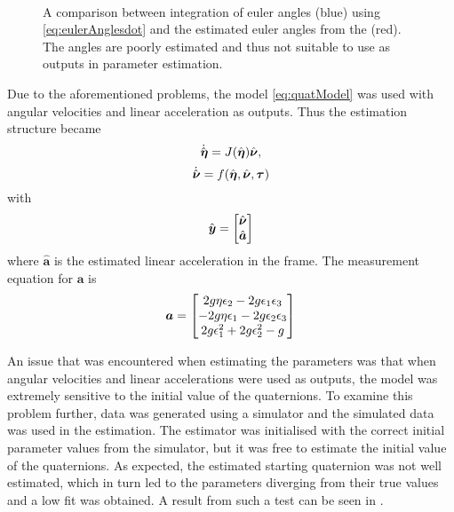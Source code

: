 \begin{figure}[htbp]
  \centering
  \qquad
  \\
  \caption{\label{fig:integratedAngleVelocities}%
  A comparison between integration of euler angles (blue) using \eqref{eq:eulerAnglesdot} and the estimated euler angles from the \abbrEKF (red). The angles are poorly estimated and thus not suitable to use as outputs in parameter estimation.}
\end{figure}
Due to the aforementioned problems, the model \eqref{eq:quatModel} was used with angular velocities and linear acceleration as outputs. Thus the estimation structure became
\begin{equation}
\dot{\hat{\boldsymbol{\eta}}} = J(\hat{\boldsymbol{\eta}}) \hat{\boldsymbol{\nu}},
\end{equation}
\begin{equation}
\dot{\hat{\boldsymbol{\nu}}} =  f(\hat{\boldsymbol{\eta}}, \hat{\boldsymbol{\nu}}, \boldsymbol{\tau})
\end{equation}
with 
\begin{equation}
\hat{\boldsymbol{y}} = \begin{bmatrix}
\hat{\boldsymbol{\nu}} \\
\hat{\boldsymbol{a}}
\end{bmatrix}
\end{equation}
where $\hat{\boldsymbol{a}}$ is the estimated linear acceleration in the \abbrROV frame. The measurement equation for $\boldsymbol{a}$ is
\begin{equation}
\boldsymbol{a} = \begin{bmatrix}
    2 g \eta \epsilon_2 -2 g \epsilon_1 \epsilon_3 \\
    -2 g \eta \epsilon_1 -2g \epsilon_2 \epsilon_3 \\
    2g \epsilon_1^2 + 2 g \epsilon_2^2 - g 
    \end{bmatrix}
\end{equation} 

An issue that was encountered when estimating the parameters was that when angular velocities and linear accelerations were used as outputs, the model was extremely sensitive to the initial value of the quaternions. To examine this problem further, data was generated using a simulator and the simulated data was used in the estimation. The estimator was initialised with the correct initial parameter values from the simulator, but it was free to estimate the initial value of the quaternions. As expected, the estimated starting quaternion was not well estimated, which in turn led to the parameters diverging from their true values and a low fit was obtained. A result from such a test can be seen in .

